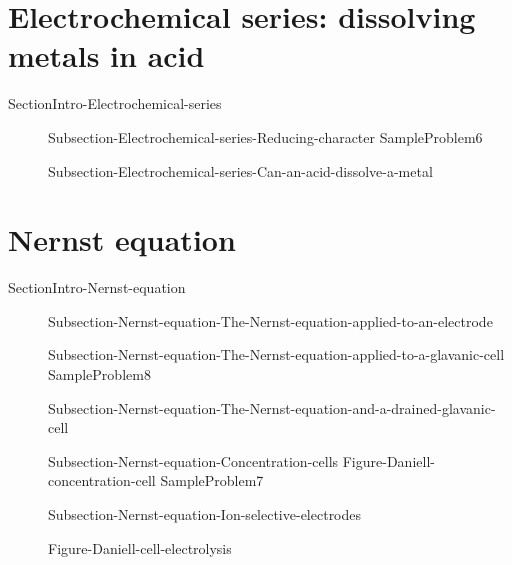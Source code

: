 \documentclass[main.tex]{subfiles}
\newcommand\chapterlabel{Ch-electrochem}\setcounter{figurenewcounter}{0}\setcounter{tablenewcounter}{0}\setcounter{formulanewcounter}{0}\chapterpicture{../{\chapterlabel}/figure1}\chapterpicturelabel{PxFuel}
\begin{document}
\section{Electrochemical series: dissolving metals in acid}{SectionIntro-Electrochemical-series}
\sloppy\begin{description}
   \item[] {Subsection-Electrochemical-series-Reducing-character}
  {SampleProblem6}
\item[] {Subsection-Electrochemical-series-Can-an-acid-dissolve-a-metal}
\end{description}


\section{Nernst equation}{SectionIntro-Nernst-equation}
\sloppy\begin{description}
   \item[] {Subsection-Nernst-equation-The-Nernst-equation-applied-to-an-electrode}
   \item[] {Subsection-Nernst-equation-The-Nernst-equation-applied-to-a-glavanic-cell}
     {SampleProblem8}
   \item[] {Subsection-Nernst-equation-The-Nernst-equation-and-a-drained-glavanic-cell}
   \item[] {Subsection-Nernst-equation-Concentration-cells}
{Figure-Daniell-concentration-cell}
  {SampleProblem7}
   \item[] {Subsection-Nernst-equation-Ion-selective-electrodes}
 
 {Figure-Daniell-cell-electrolysis}
\end{description}
\end{document}
